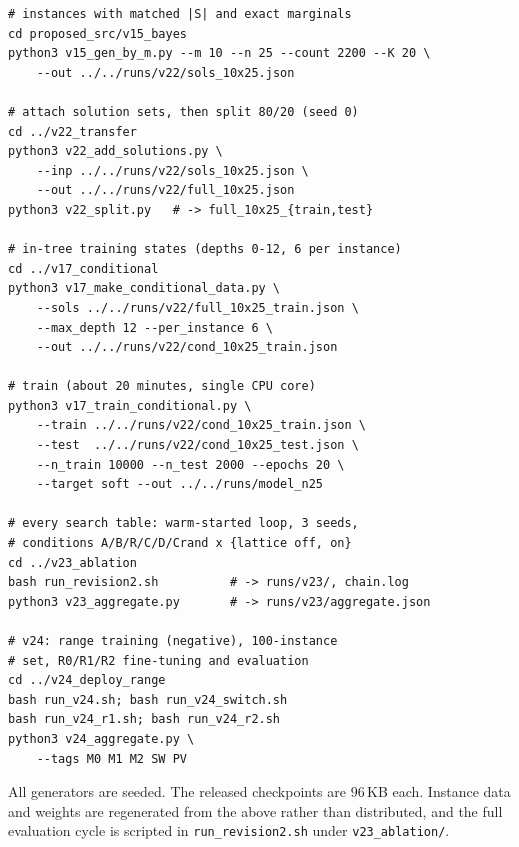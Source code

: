 \documentclass[final,5p,times,twocolumn]{elsarticle}
\begin{document}
{\footnotesize\begin{verbatim}
# instances with matched |S| and exact marginals
cd proposed_src/v15_bayes
python3 v15_gen_by_m.py --m 10 --n 25 --count 2200 --K 20 \
    --out ../../runs/v22/sols_10x25.json

# attach solution sets, then split 80/20 (seed 0)
cd ../v22_transfer
python3 v22_add_solutions.py \
    --inp ../../runs/v22/sols_10x25.json \
    --out ../../runs/v22/full_10x25.json
python3 v22_split.py   # -> full_10x25_{train,test}

# in-tree training states (depths 0-12, 6 per instance)
cd ../v17_conditional
python3 v17_make_conditional_data.py \
    --sols ../../runs/v22/full_10x25_train.json \
    --max_depth 12 --per_instance 6 \
    --out ../../runs/v22/cond_10x25_train.json

# train (about 20 minutes, single CPU core)
python3 v17_train_conditional.py \
    --train ../../runs/v22/cond_10x25_train.json \
    --test  ../../runs/v22/cond_10x25_test.json \
    --n_train 10000 --n_test 2000 --epochs 20 \
    --target soft --out ../../runs/model_n25

# every search table: warm-started loop, 3 seeds,
# conditions A/B/R/C/D/Crand x {lattice off, on}
cd ../v23_ablation
bash run_revision2.sh          # -> runs/v23/, chain.log
python3 v23_aggregate.py       # -> runs/v23/aggregate.json

# v24: range training (negative), 100-instance
# set, R0/R1/R2 fine-tuning and evaluation
cd ../v24_deploy_range
bash run_v24.sh; bash run_v24_switch.sh
bash run_v24_r1.sh; bash run_v24_r2.sh
python3 v24_aggregate.py \
    --tags M0 M1 M2 SW PV
\end{verbatim}}

All generators are seeded. The released checkpoints are $96$\,KB each. Instance data and weights are regenerated from the above rather than distributed, and the full evaluation cycle is scripted in \texttt{run\_revision2.sh} under \texttt{v23\_ablation/}.
\end{document}

